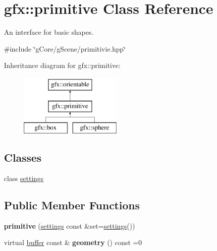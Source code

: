 \hypertarget{classgfx_1_1primitive}{\section{gfx\-:\-:primitive Class Reference}
\label{classgfx_1_1primitive}
}


An interface for basic shapes.  




{\ttfamily \#include \char`\"{}g\-Core/g\-Scene/primitivie.\-hpp\char`\"{}}

Inheritance diagram for gfx\-:\-:primitive\-:\begin{figure}[H]
\begin{center}
\leavevmode
\includegraphics[height=3.000000cm]{classgfx_1_1primitive}
\end{center}
\end{figure}
\subsection*{Classes}
\begin{DoxyCompactItemize}
\item 
class \hyperlink{classgfx_1_1primitive_1_1settings}{settings}
\end{DoxyCompactItemize}
\subsection*{Public Member Functions}
\begin{DoxyCompactItemize}
\item 
\hypertarget{classgfx_1_1primitive_a30e7e1030b859a0a322b3be3aa8913c8}{{\bfseries primitive} (\hyperlink{classgfx_1_1primitive_1_1settings}{settings} const \&set=\hyperlink{classgfx_1_1primitive_1_1settings}{settings}())}\label{classgfx_1_1primitive_a30e7e1030b859a0a322b3be3aa8913c8}

\item 
\hypertarget{classgfx_1_1primitive_a243e48daedff5cc42f4f9a6bedfbb584}{virtual \hyperlink{classgfx_1_1buffer}{buffer} const \& {\bfseries geometry} () const =0}\label{classgfx_1_1primitive_a243e48daedff5cc42f4f9a6bedfbb584}

\end{DoxyCompactItemize}
